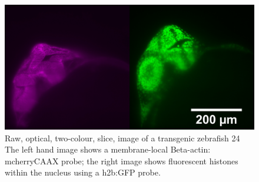 

\begin{figure}
    \centering
    \includegraphics[width=0.8\linewidth]{./fish_image}
    \caption[Two colour imaging of a transgenic \gls{zebrafish} 24 h.p.f.]{Raw, optical, two-colour, slice, image of a transgenic \gls{zebrafish} \SI{24}{}
    The left hand image shows a membrane-local Beta-actin: mcherryCAAX probe;
    the right image shows fluorescent histones within the nucleus using a h2b:GFP probe.}\label{fig:fish_image}
\end{figure}

